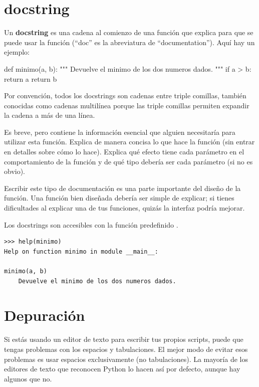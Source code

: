 \section{docstring}
\label{docstring}

Un \textbf{docstring} es una cadena al comienzo de una función que
explica para que se puede usar la función (``doc'' es la abreviatura de ``documentation'').  Aquí hay un ejemplo:

\begin{python}
def minimo(a, b):
    """
    Devuelve el minimo de los dos numeros dados.
    """
    if a > b:
        return a
    return b
\end{python}
%
Por convención, todos los docstrings son cadenas entre triple comillas, también conocidas
como cadenas multilínea porque las triple comillas permiten expandir
la cadena a más de una línea.

Es breve, pero contiene la información esencial
que alguien necesitaría para utilizar esta función.  Explica de manera concisa lo que
hace la función (sin entrar en detalles sobre cómo lo
hace).  Explica qué efecto tiene cada parámetro en el comportamiento de
la función y de qué tipo debería ser cada parámetro (si no es
obvio).

Escribir este tipo de documentación es una parte importante del diseño de la función.  Una función bien diseñada debería ser simple de explicar; si tienes dificultades al explicar una de tus funciones, quizás la interfaz podría mejorar.

Los docstrings son accesibles con la función predefinido 
.

\begin{Verbatim}[frame=single]
>>> help(minimo)
Help on function minimo in module __main__:

minimo(a, b)
    Devuelve el minimo de los dos numeros dados.
\end{Verbatim}



\hypertarget{editor}{%
\section{Depuración}\label{editor}}


Si estás usando un editor de texto para escribir tus propios scripts,
puede que tengas problemas con los espacios y tabulaciones. El mejor
modo de evitar esos problemas es usar espacios exclusivamente (no
tabulaciones). La mayoría de los editores de texto que reconocen Python
lo hacen así por defecto, aunque hay algunos que no.


